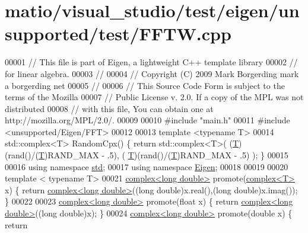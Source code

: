 \hypertarget{matio_2visual__studio_2test_2eigen_2unsupported_2test_2_f_f_t_w_8cpp_source}{}\section{matio/visual\+\_\+studio/test/eigen/unsupported/test/\+F\+F\+TW.cpp}
\label{matio_2visual__studio_2test_2eigen_2unsupported_2test_2_f_f_t_w_8cpp_source}

\begin{DoxyCode}
00001 \textcolor{comment}{// This file is part of Eigen, a lightweight C++ template library}
00002 \textcolor{comment}{// for linear algebra.}
00003 \textcolor{comment}{//}
00004 \textcolor{comment}{// Copyright (C) 2009 Mark Borgerding mark a borgerding net}
00005 \textcolor{comment}{//}
00006 \textcolor{comment}{// This Source Code Form is subject to the terms of the Mozilla}
00007 \textcolor{comment}{// Public License v. 2.0. If a copy of the MPL was not distributed}
00008 \textcolor{comment}{// with this file, You can obtain one at http://mozilla.org/MPL/2.0/.}
00009 
00010 \textcolor{preprocessor}{#include "main.h"}
00011 \textcolor{preprocessor}{#include <unsupported/Eigen/FFT>}
00012 
00013 \textcolor{keyword}{template} <\textcolor{keyword}{typename} T> 
00014 std::complex<T> RandomCpx() \{ \textcolor{keywordflow}{return} std::complex<T>( (\hyperlink{group___sparse_core___module_class_eigen_1_1_triplet}{T})(rand()/(\hyperlink{group___sparse_core___module_class_eigen_1_1_triplet}{T})RAND\_MAX - .5), (
      \hyperlink{group___sparse_core___module_class_eigen_1_1_triplet}{T})(rand()/(\hyperlink{group___sparse_core___module_class_eigen_1_1_triplet}{T})RAND\_MAX - .5) ); \}
00015 
00016 \textcolor{keyword}{using namespace }\hyperlink{namespacestd}{std};
00017 \textcolor{keyword}{using namespace }\hyperlink{namespace_eigen}{Eigen};
00018 
00019 
00020 \textcolor{keyword}{template} < \textcolor{keyword}{typename} T>
00021 \hyperlink{structcomplex}{complex<long double>}  promote(\hyperlink{structcomplex}{complex<T>} x) \{ \textcolor{keywordflow}{return} 
      \hyperlink{structcomplex}{complex<long double>}((\textcolor{keywordtype}{long} double)x.real(),(\textcolor{keywordtype}{long} double)x.imag()); \}
00022 
00023 \hyperlink{structcomplex}{complex<long double>}  promote(\textcolor{keywordtype}{float} x) \{ \textcolor{keywordflow}{return} 
      \hyperlink{structcomplex}{complex<long double>}((\textcolor{keywordtype}{long} double)x); \}
00024 \hyperlink{structcomplex}{complex<long double>}  promote(\textcolor{keywordtype}{double} x) \{ \textcolor{keywordflow}{return} 

\end{DoxyCode}
